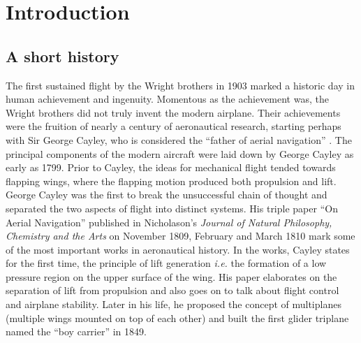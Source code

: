 \graphicspath{{imgs/}}

\chapter{Introduction}
\section{A short history}

The first sustained flight by the Wright brothers in 1903 marked a historic day in human achievement and ingenuity. Momentous as the achievement was, the Wright brothers did not truly invent the modern airplane. Their achievements were the fruition of nearly a century of aeronautical research, starting perhaps with Sir George Cayley, who is considered the ``father of aerial navigation'' \citep{gibbs-smith62}. The principal components of the modern aircraft were laid down by George Cayley as early as 1799. Prior to Cayley, the ideas for mechanical flight tended towards flapping wings, where the flapping motion produced both propulsion and lift. George Cayley was the first to break the unsuccessful chain of thought and separated the two aspects of flight into distinct systems. His triple paper ``On Aerial Navigation'' published in Nicholason's \textit{Journal of Natural Philosophy, Chemistry and the Arts} on November 1809, February and March 1810 \citep{cayley1809} mark some of the most important works in aeronautical history. In the works, Cayley states for the first time, the principle of lift generation \textit{i.e.} the formation of a low pressure region on the upper surface of the wing. His paper elaborates on the separation of lift from propulsion and also goes on to talk about flight control and airplane stability. Later in his life, he proposed the concept of multiplanes (multiple wings mounted on top of each other) and built the first glider triplane named the ``boy carrier'' in 1849.


